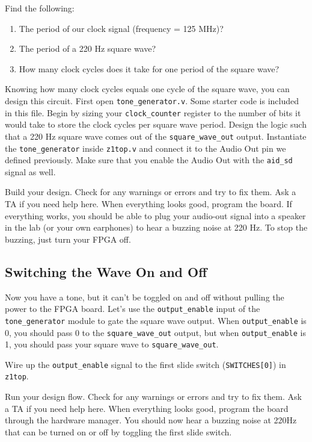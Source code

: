 \documentclass[11pt]{article}
\begin{document}
Find the following:
\begin{enumerate}
  \item The period of our clock signal (frequency = 125 MHz)?
  \item The period of a 220 Hz square wave?
  \item How many clock cycles does it take for one period of the square wave?
\end{enumerate}

Knowing how many clock cycles equals one cycle of the square wave, you can design this circuit. First open \verb|tone_generator.v|. Some starter code is included in this file. Begin by sizing your \verb|clock_counter| register to the number of bits it would take to store the clock cycles per square wave period. Design the logic such that a 220 Hz square wave comes out of the \verb|square_wave_out| output. Instantiate the \verb|tone_generator| inside \verb|z1top.v| and connect it to the Audio Out pin we defined previously. Make sure that you enable the Audio Out with the \verb|aid_sd| signal as well.

Build your design. Check for any warnings or errors and try to fix them. Ask a TA if you need help here. When everything looks good, program the board. If everything works, you should be able to plug your audio-out signal into a speaker in the lab (or your own earphones) to hear a buzzing noise at 220 Hz. To stop the buzzing, just turn your FPGA off.

\subsection{Switching the Wave On and Off}
Now you have a tone, but it can't be toggled on and off without pulling the power to the FPGA board. Let's use the \verb|output_enable| input of the \verb|tone_generator| module to gate the square wave output. When \verb|output_enable| is 0, you should pass 0 to the \verb|square_wave_out| output, but when \verb|output_enable| is 1, you should pass your square wave to \verb|square_wave_out|.

Wire up the \verb|output_enable| signal to the first slide switch (\verb|SWITCHES[0]|) in \verb|z1top|.

Run your design flow. Check for any warnings or errors and try to fix them. Ask a TA if you need help here. When everything looks good, program the board through the hardware manager. You should now hear a buzzing noise at 220Hz that can be turned on or off by toggling the first slide switch.
\end{document}
